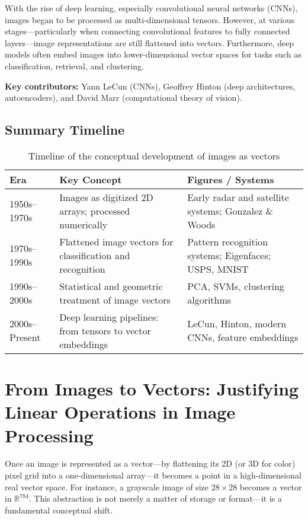 With the rise of deep learning, especially convolutional neural networks (CNNs), images began to be processed as multi-dimensional tensors. However, at various stages—particularly when connecting convolutional features to fully connected layers—image representations are still flattened into vectors. Furthermore, deep models often embed images into lower-dimensional vector spaces for tasks such as classification, retrieval, and clustering.

\textbf{Key contributors:} Yann LeCun (CNNs), Geoffrey Hinton (deep architectures, autoencoders), and David Marr (computational theory of vision).

\subsection{Summary Timeline}

\begin{table}[h]
	\centering
	\begin{tabular}{|p{3cm}|p{5.5cm}|p{4.5cm}|}
		\hline
		\textbf{Era} & \textbf{Key Concept} & \textbf{Figures / Systems} \\
		\hline
		1950s--1970s & Images as digitized 2D arrays; processed numerically & Early radar and satellite systems; Gonzalez \& Woods \\
		\hline
		1970s--1990s & Flattened image vectors for classification and recognition & Pattern recognition systems; Eigenfaces; USPS, MNIST \\
		\hline
		1990s--2000s & Statistical and geometric treatment of image vectors & PCA, SVMs, clustering algorithms \\
		\hline
		2000s--Present & Deep learning pipelines: from tensors to vector embeddings & LeCun, Hinton, modern CNNs, feature embeddings \\
		\hline
	\end{tabular}
	\caption{Timeline of the conceptual development of images as vectors}
\end{table}

\section{From Images to Vectors: Justifying Linear Operations in Image Processing}

Once an image is represented as a vector—by flattening its 2D (or 3D for color) pixel grid into a one-dimensional array—it becomes a point in a high-dimensional real vector space. For instance, a grayscale image of size $28 \times 28$ becomes a vector in $\mathbb{R}^{784}$. This abstraction is not merely a matter of storage or format—it is a fundamental conceptual shift. 

